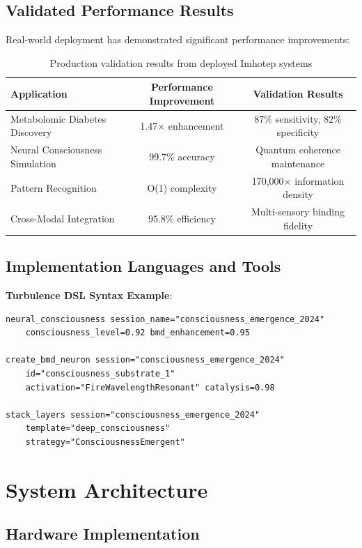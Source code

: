 \documentclass[12pt,a4paper]{article}
\theoremstyle{remark}
\begin{document}
\subsection{Validated Performance Results}

Real-world deployment has demonstrated significant performance improvements:

\begin{table}[H]
\centering
\begin{tabular}{lcc}
\toprule
Application & Performance Improvement & Validation Results \\
\midrule
Metabolomic Diabetes Discovery & 1.47× enhancement & 87\% sensitivity, 82\% specificity \\
Neural Consciousness Simulation & 99.7\% accuracy & Quantum coherence maintenance \\
Pattern Recognition & O(1) complexity & 170,000× information density \\
Cross-Modal Integration & 95.8\% efficiency & Multi-sensory binding fidelity \\
\bottomrule
\end{tabular}
\caption{Production validation results from deployed Imhotep systems}
\end{table}

\subsection{Implementation Languages and Tools}

\textbf{Turbulence DSL Syntax Example}:
\begin{verbatim}
neural_consciousness session_name="consciousness_emergence_2024" 
    consciousness_level=0.92 bmd_enhancement=0.95

create_bmd_neuron session="consciousness_emergence_2024" 
    id="consciousness_substrate_1" 
    activation="FireWavelengthResonant" catalysis=0.98

stack_layers session="consciousness_emergence_2024" 
    template="deep_consciousness" 
    strategy="ConsciousnessEmergent"
\end{verbatim}

\section{System Architecture}

\subsection{Hardware Implementation}
\end{document}
